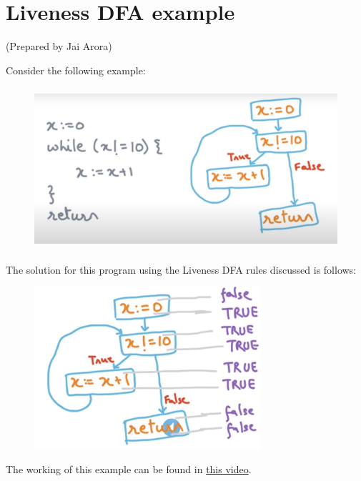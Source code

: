 \setlength{\parindent}{0pt}
\clearpage

\section{Liveness DFA example}
(Prepared by Jai Arora)
\vspace{0.3cm}

Consider the following example:

\begin{figure}[H]
        \centering
        \includegraphics[height=6cm]{images/Module83_1.png}
\end{figure}

The solution for this program using the Liveness DFA rules discussed is follows:
\begin{figure}[H]
        \centering
        \includegraphics[height=6cm]{images/Module83_2.png}
\end{figure}

The working of this example can be found in \href{https://www.youtube.com/watch?v=dTVq4gnbUYg&list=PLf3ZkSCyj1tf3rPAkOKY5hUzDrDoekAc7&index=83}{this video}.\\

